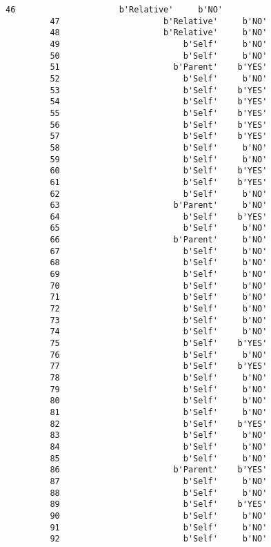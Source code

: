 \documentclass[11pt]{article}
\begin{document}
\begin{Verbatim}[commandchars=\\\{\}]
         46                     b'Relative'     b'NO'  
         47                     b'Relative'     b'NO'  
         48                     b'Relative'     b'NO'  
         49                         b'Self'     b'NO'  
         50                         b'Self'     b'NO'  
         51                       b'Parent'    b'YES'  
         52                         b'Self'     b'NO'  
         53                         b'Self'    b'YES'  
         54                         b'Self'    b'YES'  
         55                         b'Self'    b'YES'  
         56                         b'Self'    b'YES'  
         57                         b'Self'    b'YES'  
         58                         b'Self'     b'NO'  
         59                         b'Self'     b'NO'  
         60                         b'Self'    b'YES'  
         61                         b'Self'    b'YES'  
         62                         b'Self'     b'NO'  
         63                       b'Parent'     b'NO'  
         64                         b'Self'    b'YES'  
         65                         b'Self'     b'NO'  
         66                       b'Parent'     b'NO'  
         67                         b'Self'     b'NO'  
         68                         b'Self'     b'NO'  
         69                         b'Self'     b'NO'  
         70                         b'Self'     b'NO'  
         71                         b'Self'     b'NO'  
         72                         b'Self'     b'NO'  
         73                         b'Self'     b'NO'  
         74                         b'Self'     b'NO'  
         75                         b'Self'    b'YES'  
         76                         b'Self'     b'NO'  
         77                         b'Self'    b'YES'  
         78                         b'Self'     b'NO'  
         79                         b'Self'     b'NO'  
         80                         b'Self'     b'NO'  
         81                         b'Self'     b'NO'  
         82                         b'Self'    b'YES'  
         83                         b'Self'     b'NO'  
         84                         b'Self'     b'NO'  
         85                         b'Self'     b'NO'  
         86                       b'Parent'    b'YES'  
         87                         b'Self'     b'NO'  
         88                         b'Self'     b'NO'  
         89                         b'Self'    b'YES'  
         90                         b'Self'     b'NO'  
         91                         b'Self'     b'NO'  
         92                         b'Self'     b'NO'  

\end{Verbatim}
\end{document}
